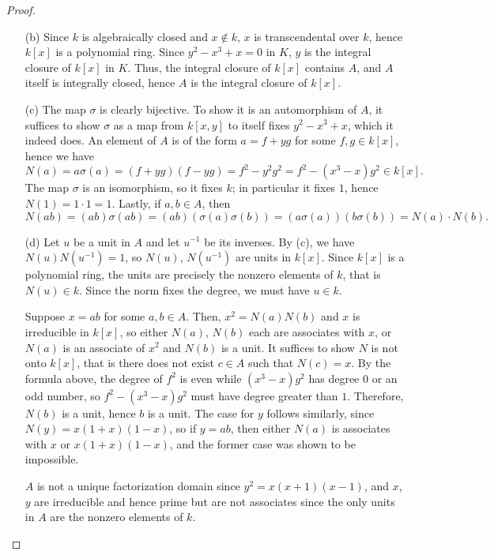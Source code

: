 \documentclass{article}
\begin{document}
\begin{enumerate} [label=\textbf{\arabic*.}, leftmargin=0cm]
\begin{proof}
\begin{itemize} [leftmargin=0cm]
    \item[(b)] Since $k$ is algebraically closed and $x \notin k$, $x$ is transcendental over $k$, hence $k[x]$ is a polynomial ring. Since $y^2 - x^3 + x = 0$ in $K$, $y$ is the integral closure of $k[x]$ in $K$. Thus, the integral closure of $k[x]$ contains $A$, and $A$ itself is integrally closed, hence $A$ is the integral closure of $k[x]$.

    \item[(c)] The map $\sigma$ is clearly bijective. To show it is an automorphism of $A$, it suffices to show $\sigma$ as a map from $k[x, y]$ to itself fixes $y^2 - x^3 + x$, which it indeed does. An element of $A$ is of the form $a = f + yg$ for some $f, g \in k[x]$, hence we have
    \begin{equation*}
      N(a) = a \sigma(a) = (f + yg)(f - yg) = f^2 - y^2g^2 = f^2 - (x^3 - x)g^2 \in k[x].
    \end{equation*}
    The map $\sigma$ is an isomorphism, so it fixes $k$; in particular it fixes $1$, hence $N(1) = 1 \cdot 1 = 1$. Lastly, if $a, b \in A$, then
    \begin{equation*}
      N(ab) = (ab) \sigma(ab) = (ab)(\sigma(a) \sigma(b)) = (a \sigma(a))(b \sigma(b)) = N(a) \cdot N(b).
    \end{equation*}

    \item[(d)] Let $u$ be a unit in $A$ and let $u^{-1}$ be its inverses. By (c), we have $N(u) N(u^{-1}) = 1$, so $N(u)$, $N(u^{-1})$ are units in $k[x]$. Since $k[x]$ is a polynomial ring, the units are precisely the nonzero elements of $k$, that is $N(u) \in k$. Since the norm fixes the degree, we must have $u \in k$.

    Suppose $x = ab$ for some $a, b \in A$. Then, $x^2 = N(a) N(b)$ and $x$ is irreducible in $k[x]$, so either $N(a)$, $N(b)$ each are associates with $x$, or $N(a)$ is an associate of $x^2$ and $N(b)$ is a unit. It suffices to show $N$ is not onto $k[x]$, that is there does not exist $c \in A$ such that $N(c) = x$. By the formula above, the degree of $f^2$ is even while $(x^3 - x)g^2$ has degree $0$ or an odd number, so $f^2 - (x^3 - x)g^2$ must have degree greater than $1$. Therefore, $N(b)$ is a unit, hence $b$ is a unit. The case for $y$ follows similarly, since $N(y) = x(1 + x)(1 - x)$, so if $y = ab$, then either $N(a)$ is associates with $x$ or $x(1 + x)(1 - x)$, and the former case was shown to be impossible.
    
    $A$ is not a unique factorization domain since $y^2 = x(x + 1)(x - 1)$, and $x$, $y$ are irreducible and hence prime but are not associates since the only units in $A$ are the nonzero elements of $k$.
  \end{itemize}
\end{proof}


\end{enumerate}
\end{document}
